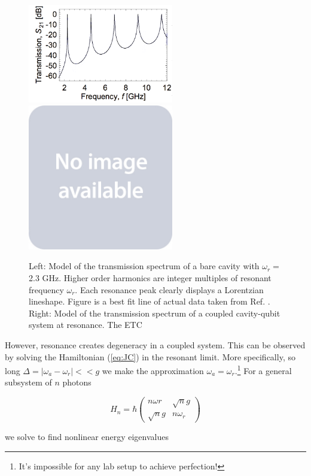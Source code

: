 \documentclass[11 pt, oneside]{book} %
\begin{document}
\begin{figure}[h] 
   \centering
   \includegraphics[width=2.5in]{Goppl-Higher-Modes.png} \includegraphics[width=2.5in]{placeholder.jpg} 
   \caption[Models of resonator transmission spectra]{Left: Model of the transmission spectrum of a bare cavity with $\omega_r=$2.3 GHz. Higher order harmonics are integer multiples of resonant frequency $\omega_r$. Each resonance peak clearly displays a Lorentzian lineshape. Figure is a best fit line of actual data taken from Ref. \cite{Goppl}. Right: Model of the transmission spectrum of a coupled cavity-qubit system at resonance. The ETC}
   \label{fig:Transmission1}
\end{figure}

However, resonance creates degeneracy in a coupled system. This can be observed by solving the Hamiltonian (\ref{eq:JC}) in the resonant limit. More specifically, so long $\Delta=|\omega_a-\omega_r|<<g$ we make the approximation $\omega_a=\omega_r$.\footnote{It's impossible for any lab setup to achieve perfection!} For a general subsystem of $n$ photons

\begin{equation}
H_n = \hbar \left( \begin{array}{cc}
n\omega{r} & \sqrt{n}g \\
\sqrt{n}g & n\omega_r
\end{array}\right)
\end{equation}

we solve to find nonlinear energy eigenvalues
\end{document}
